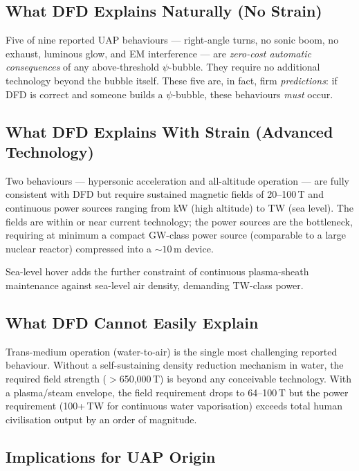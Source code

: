 \documentclass[12pt,a4paper]{article}
\begin{document}
\subsection{What DFD Explains Naturally (No Strain)}

Five of nine reported UAP behaviours --- right-angle turns, no sonic boom,
no exhaust, luminous glow, and EM interference --- are \emph{zero-cost
automatic consequences} of any above-threshold $\psi$-bubble.  They require
no additional technology beyond the bubble itself.  These five are, in fact,
firm \emph{predictions}: if DFD is correct and someone builds a $\psi$-bubble,
these behaviours \emph{must} occur.

\subsection{What DFD Explains With Strain (Advanced Technology)}

Two behaviours --- hypersonic acceleration and all-altitude operation ---
are fully consistent with DFD but require sustained magnetic fields of
20--100\,T and continuous power sources ranging from kW (high altitude)
to TW (sea level).  The fields are within or near current technology;
the power sources are the bottleneck, requiring at minimum a compact
GW-class power source (comparable to a large nuclear reactor) compressed
into a $\sim 10$\,m device.

Sea-level hover adds the further constraint of continuous plasma-sheath
maintenance against sea-level air density, demanding TW-class power.

\subsection{What DFD Cannot Easily Explain}

Trans-medium operation (water-to-air) is the single most challenging
reported behaviour.  Without a self-sustaining density reduction mechanism
in water, the required field strength ($>$650,000\,T) is beyond any
conceivable technology.  With a plasma/steam envelope, the field requirement
drops to 64--100\,T but the power requirement (100+\,TW for continuous
water vaporisation) exceeds total human civilisation output by an order
of magnitude.

\subsection{Implications for UAP Origin}
\end{document}
